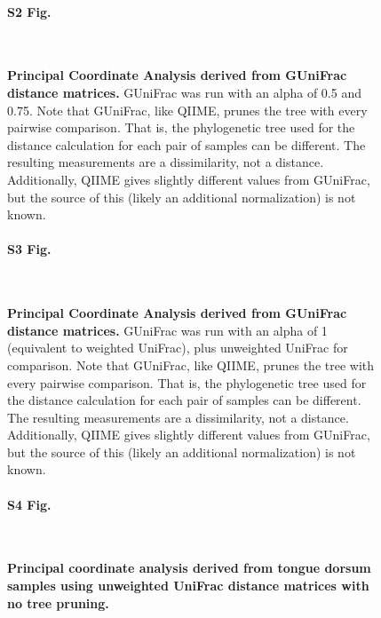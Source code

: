 \documentclass[10pt,letterpaper]{article}
\begin{document}
\begin{figure}[h]
\paragraph*{S2 Fig.}\mbox{}\\
\caption[Principal Coordinate Analysis derived from GUniFrac distance matrices.]{{\bf Principal Coordinate Analysis derived from GUniFrac distance matrices. } GUniFrac was run with an alpha of 0.5 and 0.75. Note that GUniFrac, like QIIME, prunes the tree with every pairwise comparison. That is, the phylogenetic tree used for the distance calculation for each pair of samples can be different. The resulting measurements are a dissimilarity, not a distance. Additionally, QIIME gives slightly different values from GUniFrac, but the source of this (likely an additional normalization) is not known.}
\label{gunifrac_2}
\end{figure}

\begin{figure}[h]
\paragraph*{S3 Fig.}\mbox{}\\
\caption[Principal Coordinate Analysis derived from GUniFrac distance matrices.]{{\bf Principal Coordinate Analysis derived from GUniFrac distance matrices. } GUniFrac was run with an alpha of 1 (equivalent to weighted UniFrac), plus unweighted UniFrac for comparison. Note that GUniFrac, like QIIME, prunes the tree with every pairwise comparison. That is, the phylogenetic tree used for the distance calculation for each pair of samples can be different. The resulting measurements are a dissimilarity, not a distance. Additionally, QIIME gives slightly different values from GUniFrac, but the source of this (likely an additional normalization) is not known.}
\label{gunifrac_3}
\end{figure}

\begin{figure}[h]
\paragraph*{S4 Fig.}\mbox{}\\
\caption[Principal coordinate analysis derived from tongue dorsum samples using unweighted UniFrac distance matrices with no tree pruning.]{{\bf Principal coordinate analysis derived from tongue dorsum samples using unweighted UniFrac distance matrices with no tree pruning.}}
\label{S2_Fig}
\end{figure}
\end{document}
